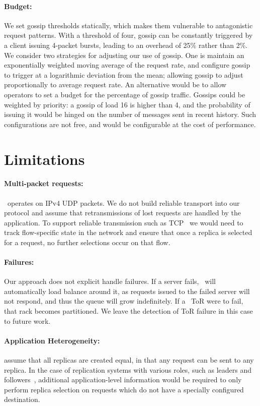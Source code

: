 \paragraph{Budget:} We set gossip thresholds statically, which makes
them vulnerable to antagonistic request patterns. With a threshold of
four, gossip can be constantly triggered by a client issuing 4-packet
bursts, leading to an overhead of 25\% rather than 2\%. We consider
two strategies for adjusting our use of gossip. One is maintain an
exponentially weighted moving average of the request rate, and
configure gossip to trigger at a logarithmic deviation from the mean;
allowing gossip to adjust proportionally to average request rate. An
alternative would be to allow operators to set a budget for the
percentage of gossip traffic.  Gossips could be
weighted by priority: a gossip of load 16 is higher than 4,
and the probability of issuing it would be hinged on the number of
messages sent in recent history. Such configurations are not free,
and would be configurable at the cost of performance.

\section{Limitations}

\paragraph{Multi-packet requests:} \toolname\ operates on IPv4 UDP packets. We
do not build reliable transport into our protocol and assume that
retransmissions of lost requests are handled by the application. To support
reliable transmission such as TCP \toolname\, we would need to track
flow-specific state in the network and ensure that once a replica is selected
for a request, no further selections occur on that flow.

\paragraph{Failures:} Our approach does not explicit handle failures. If a
server fails, \toolname\ will automatically load balance around it, as requests
issued to the failed server will not respond, and thus the queue will grow
indefinitely. If a \toolname\ ToR were to fail, that rack becomes partitioned.
We leave the detection of ToR failure in this case to future work.

\paragraph{Application Heterogeneity:} \toolname assume that all replicas are
created equal, in that any request can be sent to any replica. In the case of
replication systems with various roles, such as leaders and
followers~\cite{raft}, additional application-level information would be
required to only perform replica selection on requests which do not have a
specially configured destination.

